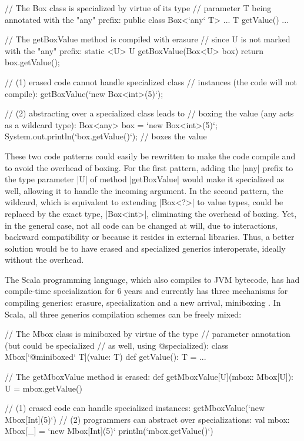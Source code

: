 \begin{lstlisting-nobreak}
// The Box class is specialized by virtue of its type
// parameter T being annotated with the "any" prefix:
public class Box<`any` T> {
  ...
  T getValue() { ... }
}

// The getBoxValue method is compiled with erasure
// since U is not marked with the "any" prefix:
static <U> U getBoxValue(Box<U> box) {
  return box.getValue();
}

// (1) erased code cannot handle specialized class
//        instances (the code will not compile):
getBoxValue(`new Box<int>(5)`);

// (2) abstracting over a specialized class leads to
//        boxing the value (any acts as a wildcard type):
Box<any> box = `new Box<int>(5)`;
System.out.println(`box.getValue()`); // boxes the value
\end{lstlisting-nobreak}

These two code patterns could easily be rewritten to make the code compile and to avoid the overhead of boxing. For the first pattern, adding the |any| prefix to the type parameter |U| of method |getBoxValue| would make it specialized as well, allowing it to handle the incoming argument. In the second pattern, the wildcard, which is equivalent to extending |Box<?>| to value types, could be replaced by the exact type, |Box<int>|, eliminating the overhead of boxing. Yet, in the general case, not all code can be changed at will, due to interactions, backward compatibility or because it resides in external libraries. Thus, a better solution would be to have erased and specialized generics interoperate, ideally without the overhead.

The Scala programming language, which also compiles to JVM bytecode, has had compile-time specialization for 6 years \cite{iuli-thesis, specialization-iuli} and currently has three mechanisms for compiling generics: erasure, specialization and a new arrival, miniboxing \cite{miniboxing}. In Scala, all three generics compilation schemes can be freely mixed:

\begin{lstlisting-nobreak}
// The Mbox class is miniboxed by virtue of the type
// parameter annotation (but could be specialized
// as well, using @specialized):
class Mbox[`@miniboxed` T](value: T) {
  def getValue(): T = ...
}

// The getMboxValue method is erased:
def getMboxValue[U](mbox: Mbox[U]): U = mbox.getValue()

// (1) erased code can handle specialized instances:
getMboxValue(`new Mbox[Int](5)`)
// (2) programmers can abstract over specializations:
val mbox: Mbox[_] = `new Mbox[Int](5)`
println(`mbox.getValue()`)
\end{lstlisting-nobreak}

